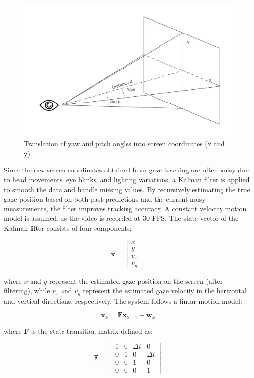\documentclass[10pt,a4paper,twoside]{article}
\begin{document}
\begin{figure} [h!]
    \centering
    \includegraphics[width=0.6\linewidth]{image/screen_translation.png}
    \caption{Translation of yaw and pitch angles into screen coordinates (x and y).}
    \label{fig:translation}
\end{figure}

Since the raw screen coordinates obtained from gaze tracking are often noisy due to head movements, eye blinks, and lighting variations, a Kalman filter \cite{kalman1960new} is applied to smooth the data and handle missing values. By recursively estimating the true gaze position based on both past predictions and the current noisy measurements, the filter improves tracking accuracy. A constant velocity motion model is assumed, as the video is recorded at 30 FPS. The state vector of the Kalman filter consists of four components:

\begin{equation}
\label{eq4}
\mathbf{x} = \begin{bmatrix} x \\ y \\ v_x \\ v_y \end{bmatrix}
\end{equation}

where \( x \) and \( y \) represent the estimated gaze position on the screen (after filtering), while \( v_x \) and \( v_y \) represent the estimated gaze velocity in the horizontal and vertical directions, respectively. The system follows a linear motion model:

\begin{equation}
\label{eq5}
\mathbf{x}_k = \mathbf{F} \mathbf{x}_{k-1} + \mathbf{w}_k
\end{equation}

where \( \mathbf{F} \) is the state transition matrix defined as:

\begin{equation}
\label{eq6}
\mathbf{F} =
\begin{bmatrix}
1 & 0 & \Delta t & 0 \\
0 & 1 & 0 & \Delta t \\
0 & 0 & 1 & 0 \\
0 & 0 & 0 & 1
\end{bmatrix}
\end{equation}
\end{document}
